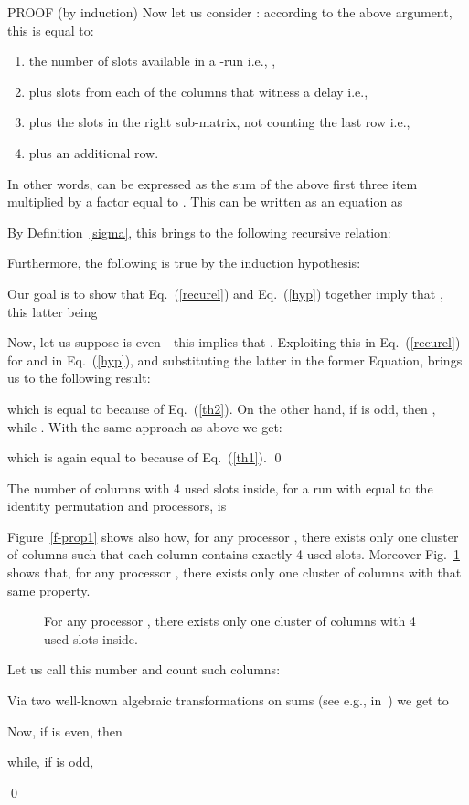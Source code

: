 \documentclass{elsart}
\begin{document}
\begin{pf*}{PROOF (by induction)}
Now let us consider : according to the above argument,
this is equal to:
\begin{enumerate}
\item the number of slots available in a
-run i.e., ,
\item plus  slots from each of the columns 
that witness a delay i.e.,  

\item plus the slots in the right sub-matrix, not counting
the last row i.e., 

\item plus an additional row.
\end{enumerate}

In other words,  can be expressed as the sum of the above
first three item multiplied by a factor equal to .
This can be written as an equation as


By Definition~\ref{sigma}, this brings to the following recursive relation:


Furthermore, the following is true by the induction hypothesis:


Our goal is to show that Eq.~(\ref{recurel}) and Eq.~(\ref{hyp})
together imply that , this latter being



Now, let us suppose  is even---this implies that
.
Exploiting this in Eq.~(\ref{recurel}) for  and in Eq.~(\ref{hyp}), and
substituting the latter in the former Equation, brings us
to the following result:


which is equal to  because of Eq.~(\ref{th2}). 
On the other hand, if  is odd, then , while
. With the same approach as above we get:

which is again equal to  because of Eq.~(\ref{th1}). 
\qed
\end{pf*}

\begin{lem}\label{4slot.clusters}
The number of columns with 4 used slots inside, for a run with  equal to the identity 
permutation and  processors, is

\end{lem}
\begin{pf}
Figure~\ref{f-prop1} shows also how, for any processor , there exists
only one cluster of  columns such that each column contains exactly 4 used slots.
Moreover Fig.~\ref{f-prop2} shows that, for any processor , there exists
only one cluster of  columns with that same property.

\begin{figure}[h]
\centerline{}
\caption{For any processor , there exists only one
cluster of  columns with 4 used slots inside.}
\label{f-prop2}
\end{figure}

Let us call  this number and count such columns:

Via two well-known algebraic transformations on sums (see
e.g., in~\cite{GrKn86,PuBr85})
we get to


Now, if  is even, then


\noindent
while, if  is odd,

\qed
\end{pf}
\end{document}
